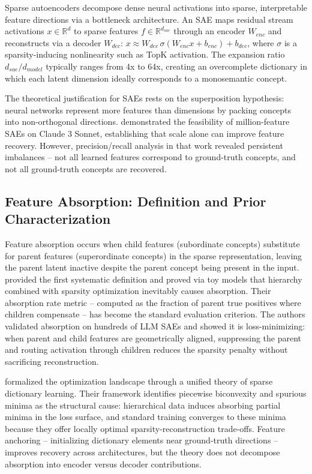\documentclass{article}
\begin{document}
Sparse autoencoders decompose dense neural activations into sparse, interpretable feature directions via a bottleneck architecture. An SAE maps residual stream activations $x \in \mathbb{R}^d$ to sparse features $f \in \mathbb{R}^{d_{sae}}$ through an encoder $W_{enc}$ and reconstructs via a decoder $W_{dec}$: $x \approx W_{dec} \, \sigma(W_{enc} x + b_{enc}) + b_{dec}$, where $\sigma$ is a sparsity-inducing nonlinearity such as TopK activation. The expansion ratio $d_{sae} / d_{model}$ typically ranges from 4x to 64x, creating an overcomplete dictionary in which each latent dimension ideally corresponds to a monosemantic concept.

The theoretical justification for SAEs rests on the superposition hypothesis: neural networks represent more features than dimensions by packing concepts into non-orthogonal directions. \citet{bricken2023} demonstrated the feasibility of million-feature SAEs on Claude 3 Sonnet, establishing that scale alone can improve feature recovery. However, precision/recall analysis in that work revealed persistent imbalances -- not all learned features correspond to ground-truth concepts, and not all ground-truth concepts are recovered.

\subsection{Feature Absorption: Definition and Prior Characterization}

Feature absorption occurs when child features (subordinate concepts) substitute for parent features (superordinate concepts) in the sparse representation, leaving the parent latent inactive despite the parent concept being present in the input. \citet{chanin2024} provided the first systematic definition and proved via toy models that hierarchy combined with sparsity optimization inevitably causes absorption. Their absorption rate metric -- computed as the fraction of parent true positives where children compensate -- has become the standard evaluation criterion. The authors validated absorption on hundreds of LLM SAEs and showed it is loss-minimizing: when parent and child features are geometrically aligned, suppressing the parent and routing activation through children reduces the sparsity penalty without sacrificing reconstruction.

\citet{marks2025} formalized the optimization landscape through a unified theory of sparse dictionary learning. Their framework identifies piecewise biconvexity and spurious minima as the structural cause: hierarchical data induces absorbing partial minima in the loss surface, and standard training converges to these minima because they offer locally optimal sparsity-reconstruction trade-offs. Feature anchoring -- initializing dictionary elements near ground-truth directions -- improves recovery across architectures, but the theory does not decompose absorption into encoder versus decoder contributions.
\end{document}
